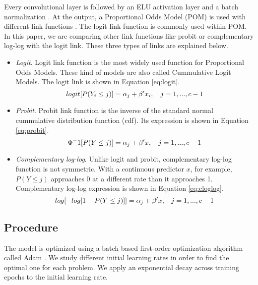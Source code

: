 \documentclass[10pt, a4paper, titlepage]{article}
\begin{document}
\begin{multicols}{2}
	Every convolutional layer is followed by an ELU activation layer \cite{clevert2015fast} and a batch normalization \cite{ioffe2015batch}. At the output, a Proportional Odds Model (POM) is used with different link functions \cite{agresti2010analysis}. The logit link function is commonly used within POM. In this paper, we are comparing other link functions like probit or complementary log-log with the logit link. These three types of links are explained below.
	
	\begin{itemize}
		\item \textit{Logit}. Logit link function is the most widely used function for Proportional Odds Models. These kind of models are also called Cummulative Logit Models. The logit link is shown in Equation \ref{eq:logit}.
		\begin{equation}
		\small
		logit[P(Y_i \le j)] = \alpha_j + \beta'x_i,\quad j = 1, ..., c - 1
		\label{eq:logit}
		\end{equation}
		\item \textit{Probit}. Probit link function is the inverse of the standard normal cummulative distribution function (cdf). Its expression is shown in Equation \ref{eq:probit}.	
		\begin{equation}
		\small
		\Phi^-1[P(Y \le j)] = \alpha_j + \beta'x,\quad j = 1, ..., c - 1
		\label{eq:probit}
		\end{equation}
		\item \textit{Complementary log-log}. Unlike logit and probit, complementary log-log function is not symmetric. With a continuous predictor $x$, for example, $P(Y \le j)$ approaches 0 at a different rate than it approaches 1. Complementary log-log expression is shown in Equation \ref{eq:cloglog}.
		\begin{equation}
		\footnotesize
		log[-log[1 - P(Y \le j)]] = \alpha_j + \beta'x,\quad j = 1, ..., c - 1
		\label{eq:cloglog}
		\end{equation}
	\end{itemize}
	
	\subsection{Procedure}
	The model is optimized using a batch based first-order optimization algorithm called Adam \cite{kingma2014adam}. We study different initial learning rates in order to find the optimal one for each problem. We apply an exponential decay across training epochs to the initial learning rate.
	

\end{multicols}
\end{document}

